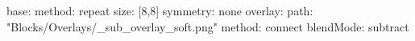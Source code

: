 base:
  method: repeat
  size: [8,8]
  symmetry: none
overlay:
  path: "Blocks/Overlays/_sub_overlay_soft.png"
  method: connect
blendMode: subtract